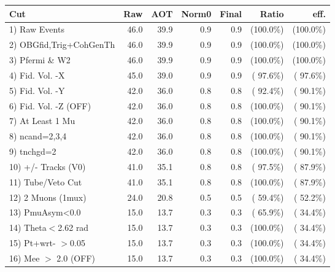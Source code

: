  \begin{table}[h!]\centering
 \begin{tabular}{||l||r|r|r|r|r|r||}
 \hline
 \hline
 Cut & Raw & AOT & Norm0 & Final & Ratio & eff.       \\
 \hline
  1) Raw Events           &         46.0 &         39.9 &          0.9 &          0.9 & (100.0\%) & (100.0\%) \\
  2) OBGfid,Trig+CohGenTh &         46.0 &         39.9 &          0.9 &          0.9 & (100.0\%) & (100.0\%) \\
  3) Pfermi \& W2         &         46.0 &         39.9 &          0.9 &          0.9 & (100.0\%) & (100.0\%) \\
  4) Fid. Vol. -X         &         45.0 &         39.0 &          0.9 &          0.9 & ( 97.6\%) & ( 97.6\%) \\
  5) Fid. Vol. -Y         &         42.0 &         36.0 &          0.8 &          0.8 & ( 92.4\%) & ( 90.1\%) \\
  6) Fid. Vol. -Z (OFF)   &         42.0 &         36.0 &          0.8 &          0.8 & (100.0\%) & ( 90.1\%) \\
  7) At Least 1 Mu        &         42.0 &         36.0 &          0.8 &          0.8 & (100.0\%) & ( 90.1\%) \\
  8) ncand=2,3,4          &         42.0 &         36.0 &          0.8 &          0.8 & (100.0\%) & ( 90.1\%) \\
  9) tnchgd=2             &         42.0 &         36.0 &          0.8 &          0.8 & (100.0\%) & ( 90.1\%) \\
 10) +/- Tracks (V0)      &         41.0 &         35.1 &          0.8 &          0.8 & ( 97.5\%) & ( 87.9\%) \\
 11) Tube/Veto Cut        &         41.0 &         35.1 &          0.8 &          0.8 & (100.0\%) & ( 87.9\%) \\
 12) 2 Muons (1mux)       &         24.0 &         20.8 &          0.5 &          0.5 & ( 59.4\%) & ( 52.2\%) \\
 13) PmuAsym<0.0          &         15.0 &         13.7 &          0.3 &          0.3 & ( 65.9\%) & ( 34.4\%) \\
 14) Theta$<$2.62 rad     &         15.0 &         13.7 &          0.3 &          0.3 & (100.0\%) & ( 34.4\%) \\
 15) Pt+wrt- $>$0.05      &         15.0 &         13.7 &          0.3 &          0.3 & (100.0\%) & ( 34.4\%) \\
 16) Mee $>$ 2.0  (OFF)   &         15.0 &         13.7 &          0.3 &          0.3 & (100.0\%) & ( 34.4\%) \\

\end{tabular}
\end{table}
